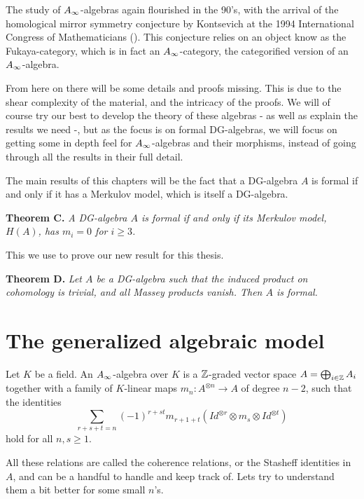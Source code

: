 The study of $\A$-algebras again flourished in the 90's, with the arrival of the homological mirror symmetry conjecture by Kontsevich at the 1994 International Congress of Mathematicians (\cite{kontsevich}). This conjecture relies on an object know as the Fukaya-category, which is in fact an $\A$-category, the categorified version of an $\A$-algebra.

From here on there will be some details and proofs missing. This is due to the shear complexity of the material, and the intricacy of the proofs. We will of course try our best to develop the theory of these algebras - as well as explain the results we need -, but as the focus is on formal DG-algebras, we will focus on getting some in depth feel for $\A$-algebras and their morphisms, instead of going through all the results in their full detail.

The main results of this chapters will be the fact that a DG-algebra $A$ is formal if and only if it has a Merkulov model, which is itself a DG-algebra. 

\textbf{Theorem C.} \textit{A DG-algebra $A$ is formal if and only if its Merkulov model, $H(A)$, has $m_i=0$ for $i\geq 3$.}

This we use to prove our new result for this thesis. 

\textbf{Theorem D.} \textit{Let $A$ be a DG-algebra such that the induced product on cohomology is trivial, and all Massey products vanish. Then $A$ is formal.}

\section{The generalized algebraic model}

\begin{definition}[$\A$-algebra]
    Let $K$ be a field. An $\A$-algebra over $K$ is a $\mathbb{Z}$-graded vector space $A=\bigoplus_{i\in \mathbb{Z}}A_i$ together with a family of $K$-linear maps $m_n : A^{\otimes n}\rightarrow A$ of degree $n-2$, such that the identities 
    \begin{equation*}
        \sum_{r+s+t = n}(-1)^{r+st}m_{r+1+t}(Id^{\otimes r}\otimes m_s \otimes Id^{\otimes t})
    \end{equation*}
    hold for all $n, s\geq 1$. 
\end{definition}

All these relations are called the coherence relations, or the Stasheff identities in $A$, and can be a handful to handle and keep track of. Lets try to understand them a bit better for some small $n$'s. 

